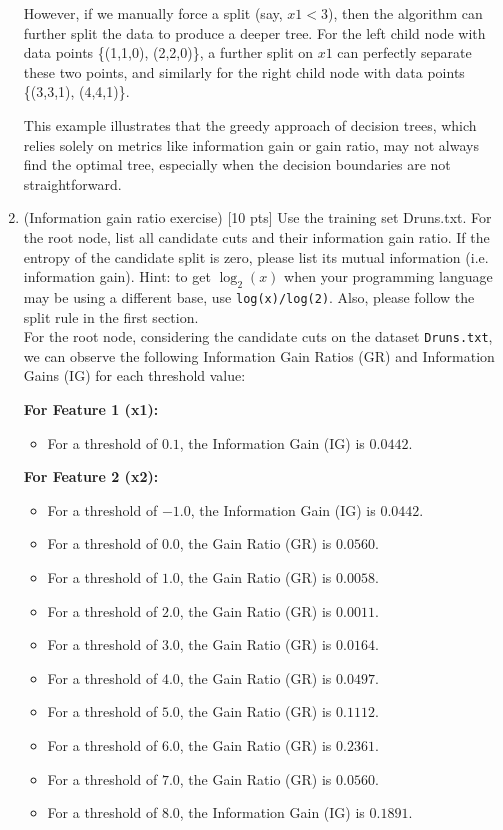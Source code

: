 \documentclass[a4paper]{article}
\theoremstyle{definition}
\begin{document}
\begin{enumerate}
However, if we manually force a split (say, \( x1 < 3 \)), then the algorithm can further split the data to produce a deeper tree. For the left child node with data points \{(1,1,0), (2,2,0)\}, a further split on \( x1 \) can perfectly separate these two points, and similarly for the right child node with data points \{(3,3,1), (4,4,1)\}.

This example illustrates that the greedy approach of decision trees, which relies solely on metrics like information gain or gain ratio, may not always find the optimal tree, especially when the decision boundaries are not straightforward.

\item (Information gain ratio exercise)  [10 pts] Use the training set Druns.txt.  For the root node, list all candidate cuts and their information gain ratio. If the entropy of the candidate split is zero, please list its mutual information (i.e. information gain). Hint: to get $\log_2(x)$ when your programming language may be using a different base, use \verb|log(x)/log(2)|. Also, please follow the split rule in the first section. \\

For the root node, considering the candidate cuts on the dataset \texttt{Druns.txt}, we can observe the following Information Gain Ratios (GR) and Information Gains (IG) for each threshold value:

\textbf{For Feature 1 (x1):}
\begin{itemize}
    \item For a threshold of \(0.1\), the Information Gain (IG) is \(0.0442\).
\end{itemize}

\textbf{For Feature 2 (x2):}
\begin{itemize}
    \item For a threshold of \(-1.0\), the Information Gain (IG) is \(0.0442\).
    \item For a threshold of \(0.0\), the Gain Ratio (GR) is \(0.0560\).
    \item For a threshold of \(1.0\), the Gain Ratio (GR) is \(0.0058\).
    \item For a threshold of \(2.0\), the Gain Ratio (GR) is \(0.0011\).
    \item For a threshold of \(3.0\), the Gain Ratio (GR) is \(0.0164\).
    \item For a threshold of \(4.0\), the Gain Ratio (GR) is \(0.0497\).
    \item For a threshold of \(5.0\), the Gain Ratio (GR) is \(0.1112\).
    \item For a threshold of \(6.0\), the Gain Ratio (GR) is \(0.2361\).
    \item For a threshold of \(7.0\), the Gain Ratio (GR) is \(0.0560\).
    \item For a threshold of \(8.0\), the Information Gain (IG) is \(0.1891\).
\end{itemize}


\end{enumerate}
\end{document}
